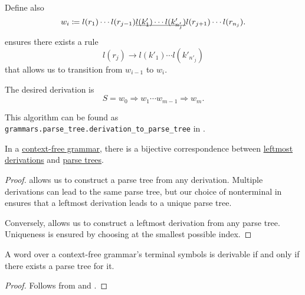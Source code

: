 \begin{algorithm}
\begin{thmenum}
\begin{itemize}
      Define also
      \begin{equation*}
        w_i \coloneqq l(r_1) \cdots l(r_{j-1}) \underline{\smash{ l(k'_1) \cdots l(k'_{n'_j}) }} l(r_{j+1}) \cdots l(r_{n_j}).
      \end{equation*}

       ensures there exists a rule
      \begin{equation*}
        l(r_j) \to l(k'_1) \cdots l(k'_{n'_j})
      \end{equation*}
      that allows us to transition from \( w_{i-1} \) to \( w_i \).
    \end{itemize}

     The desired derivation is
    \begin{equation*}
      S = w_0 \Rightarrow w_1 \cdots w_{m-1} \Rightarrow w_m.
    \end{equation*}
  \end{thmenum}
\end{algorithm}
\begin{comments}
  \item This algorithm can be found as \texttt{grammars.parse\_tree.derivation\_to\_parse\_tree} in \cite{code}.
\end{comments}

\begin{proposition}\label{thm:derivations_and_parse_trees}
  In a \hyperref[def:chomsky_hierarchy/context_free]{context-free grammar}, there is a bijective correspondence between \hyperref[def:leftmost_derivation]{leftmost derivations} and \hyperref[def:parse_tree]{parse trees}.
\end{proposition}
\begin{proof}
   allows us to construct a parse tree from any derivation. Multiple derivations can lead to the same parse tree, but our choice of nonterminal in  ensures that a leftmost derivation leads to a unique parse tree.

  Conversely,  allows us to construct a leftmost derivation from any parse tree. Uniqueness is ensured by choosing at  the smallest possible index.
\end{proof}

\begin{corollary}\label{thm:parse_tree_existence}
   A word over a context-free grammar's terminal symbols is derivable if and only if there exists a parse tree for it.
\end{corollary}
\begin{proof}
  Follows from  and .
\end{proof}

